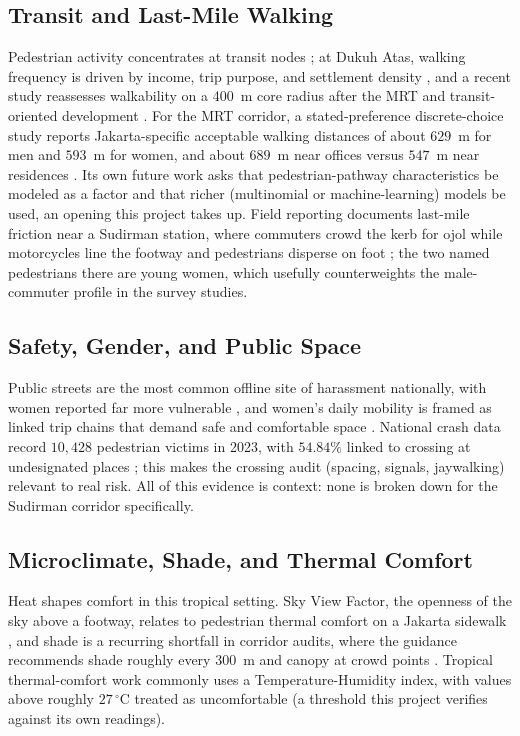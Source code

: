 \documentclass[conference]{IEEEtran}
\begin{document}
\subsection{Transit and Last-Mile Walking}
Pedestrian activity concentrates at transit nodes \autocite{dwisadana2024}; at Dukuh Atas, walking
frequency is driven by income, trip purpose, and settlement density \autocite{rakhmatulloh2020},
and a recent study reassesses walkability on a 400~m core radius after the MRT and
transit-oriented development \autocite{napitupulu2025tod}. For the MRT corridor, a
stated-preference discrete-choice study reports Jakarta-specific acceptable walking distances of
about $629$~m for men and $593$~m for women, and about $689$~m near offices versus $547$~m near
residences \autocite{afkara2020walking}. Its own future work asks that pedestrian-pathway
characteristics be modeled as a factor and that richer (multinomial or machine-learning) models be
used, an opening this project takes up. Field reporting documents last-mile friction near a
Sudirman station, where commuters crowd the kerb for ojol while motorcycles line the footway and
pedestrians disperse on foot \autocite{kompas2025ojol}; the two named pedestrians there are young
women, which usefully counterweights the male-commuter profile in the survey studies.

\subsection{Safety, Gender, and Public Space}
Public streets are the most common offline site of harassment nationally, with women reported far
more vulnerable \autocite{krpa2022}, and women's daily mobility is framed as linked trip chains
that demand safe and comfortable space \autocite{udk_mobilitasperempuan}. National crash data
record $10{,}428$ pedestrian victims in 2023, with $54.84\%$ linked to crossing at undesignated
places \autocite{korlantas2023}; this makes the crossing audit (spacing, signals, jaywalking)
relevant to real risk. All of this evidence is context: none is broken down for the Sudirman
corridor specifically.

\subsection{Microclimate, Shade, and Thermal Comfort}
Heat shapes comfort in this tropical setting. Sky View Factor, the openness of the sky above a
footway, relates to pedestrian thermal comfort on a Jakarta sidewalk \autocite{arif2021skyview},
and shade is a recurring shortfall in corridor audits, where the guidance recommends shade roughly
every $300$~m and canopy at crowd points \autocite{dwisadana2024}. Tropical thermal-comfort work
commonly uses a Temperature-Humidity index, with values above roughly $27\,^{\circ}$C treated as
uncomfortable (a threshold this project verifies against its own readings).
\end{document}
